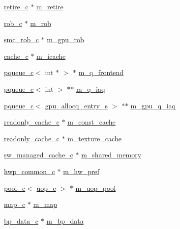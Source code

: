 \begin{DoxyCompactItemize}
\item 
\hyperlink{classretire__c}{retire\_\-c} $\ast$ \hyperlink{classcore__c_a4dba9e666c600c1447931538b2ea7af9}{m\_\-retire}
\item 
\hyperlink{classrob__c}{rob\_\-c} $\ast$ \hyperlink{classcore__c_a14662c872c7534776c37e5befffffab3}{m\_\-rob}
\item 
\hyperlink{classsmc__rob__c}{smc\_\-rob\_\-c} $\ast$ \hyperlink{classcore__c_a821a374875ef6687d28537b2d79b4d8a}{m\_\-gpu\_\-rob}
\item 
\hyperlink{classcache__c}{cache\_\-c} $\ast$ \hyperlink{classcore__c_a103da306f4d8d3357ede4d8e2fe05b7f}{m\_\-icache}
\item 
\hyperlink{classpqueue__c}{pqueue\_\-c}$<$ int $\ast$ $>$ $\ast$ \hyperlink{classcore__c_a0f31904381b06495a98b272fff7e7ac6}{m\_\-q\_\-frontend}
\item 
\hyperlink{classpqueue__c}{pqueue\_\-c}$<$ int $>$ $\ast$$\ast$ \hyperlink{classcore__c_ad0ab47cd7f7b92c21485280a30d9ed60}{m\_\-q\_\-iaq}
\item 
\hyperlink{classpqueue__c}{pqueue\_\-c}$<$ \hyperlink{structgpu__allocq__entry__s}{gpu\_\-allocq\_\-entry\_\-s} $>$ $\ast$$\ast$ \hyperlink{classcore__c_a734b85a96e2063b1e950c7fd3cc7f70a}{m\_\-gpu\_\-q\_\-iaq}
\item 
\hyperlink{classreadonly__cache__c}{readonly\_\-cache\_\-c} $\ast$ \hyperlink{classcore__c_a261f82109e1752f5b793be98049f1c33}{m\_\-const\_\-cache}
\item 
\hyperlink{classreadonly__cache__c}{readonly\_\-cache\_\-c} $\ast$ \hyperlink{classcore__c_ab18e0b298c8ea8cc1fc28751cbd7bd1c}{m\_\-texture\_\-cache}
\item 
\hyperlink{classsw__managed__cache__c}{sw\_\-managed\_\-cache\_\-c} $\ast$ \hyperlink{classcore__c_a7677f44bc75a171c27870c8b8212c875}{m\_\-shared\_\-memory}
\item 
\hyperlink{classhwp__common__c}{hwp\_\-common\_\-c} $\ast$ \hyperlink{classcore__c_a6015358ff17f7b469bed14a16c06e455}{m\_\-hw\_\-pref}
\item 
\hyperlink{classpool__c}{pool\_\-c}$<$ \hyperlink{classuop__c}{uop\_\-c} $>$ $\ast$ \hyperlink{classcore__c_ad3c1d93713fb463bbde16f8dfa125de6}{m\_\-uop\_\-pool}
\item 
\hyperlink{classmap__c}{map\_\-c} $\ast$ \hyperlink{classcore__c_add5704c9cc600653514b61560307d961}{m\_\-map}
\item 
\hyperlink{classbp__data__c}{bp\_\-data\_\-c} $\ast$ \hyperlink{classcore__c_ab8e8bae41d47d3bfbd25980b70e613f7}{m\_\-bp\_\-data}

\end{DoxyCompactItemize}
